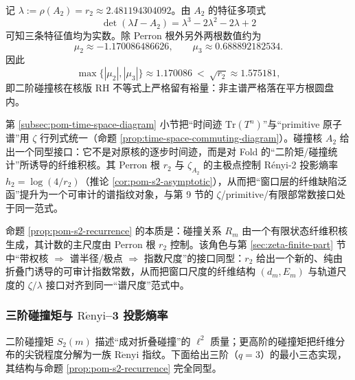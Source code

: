 \begin{remark}\label{rem:pom-collision-rh-margin}
记 \(\lambda:=\rho(A_2)=r_2\approx 2.481194304092\)。由 \(A_2\) 的特征多项式
\[
\det(\lambda I-A_2)=\lambda^3-2\lambda^2-2\lambda+2
\]
可知三条特征值均为实数。除 Perron 根外另外两根数值约为
\[
\mu_2\approx -1.170086486626,\qquad
\mu_3\approx 0.688892182534.
\]
因此
\[
\max\{|\mu_2|,|\mu_3|\}\approx 1.170086\ <\ \sqrt{r_2}\approx 1.575181,
\]
即二阶碰撞核在核版 RH 不等式上严格留有裕量：非主谱严格落在平方根圆盘内。
\end{remark}

\begin{remark}\label{rem:pom-collision-diagram}
第 \ref{subsec:pom-time-space-diagram} 小节把“时间迹 \(\mathrm{Tr}(T^n)\)”与“primitive 原子谱”用 \(\zeta\) 行列式统一（命题 \ref{prop:time-space-commuting-diagram}）。碰撞核 \(A_2\) 给出一个同型接口：它不是对原核的逐步时间迹，而是对 Fold 的“二阶矩/碰撞统计”所诱导的纤维积核。其 Perron 根 \(r_2\) 与 \(\zeta_{A_2}\) 的主极点控制 Rényi-2 投影熵率 \(h_2=\log(4/r_2)\)（推论 \ref{cor:pom-s2-asymptotic}），从而把“窗口层的纤维缺陷泛函”提升为一个可审计的谱指纹对象，与第 9 节的 \(\zeta\)/primitive/有限部常数接口处于同一范式。
\end{remark}

\begin{remark}\label{rem:pom-s2-zeta}
命题 \ref{prop:pom-s2-recurrence} 的本质是：碰撞关系 \(R_m\) 由一个有限状态纤维积核生成，其计数的主尺度由 Perron 根 \(r_2\) 控制。该角色与第 \ref{sec:zeta-finite-part} 节中“带权核 \(\Rightarrow\) 谱半径/极点 \(\Rightarrow\) 指数尺度”的接口同型：\(r_2\) 给出一个新的、纯由折叠门诱导的可审计指数常数，从而把窗口尺度的纤维结构 \((d_m,E_m)\) 与轨道尺度的 \(\zeta/\lambda\) 接口对齐到同一“谱尺度”范式中。
\end{remark}

\subsubsection{三阶碰撞矩与 \texorpdfstring{$\mathrm{R\acute{e}nyi}$}{Renyi}--3 投影熵率}\label{subsec:pom-s3}
二阶碰撞矩 \(S_2(m)\) 描述“成对折叠碰撞”的 \(\ell^2\) 质量；更高阶的碰撞矩把纤维分布的尖锐程度分解为一族 \(\mathrm{R\acute{e}nyi}\) 指纹。下面给出三阶（\(q=3\)）的最小三态实现，其结构与命题 \ref{prop:pom-s2-recurrence} 完全同型。

